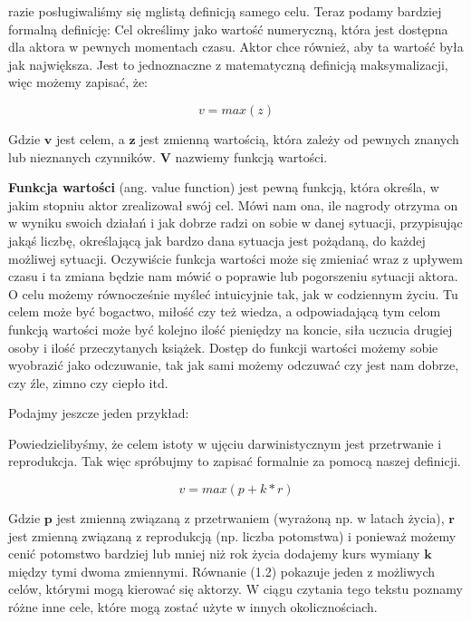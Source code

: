 razie posługiwaliśmy się mglistą definicją samego celu. Teraz podamy bardziej formalną definicję: Cel określimy jako wartość numeryczną, która jest dostępna dla aktora w pewnych momentach czasu. Aktor chce również, aby ta wartość była jak największa. Jest to jednoznaczne z matematyczną definicją maksymalizacji, więc możemy zapisać, że:

\begin{equation}
v = max(z)
\end{equation}

\noindent Gdzie $\boldsymbol{v}$ jest celem, a $\boldsymbol{z}$ jest zmienną wartością, która zależy od pewnych znanych lub nieznanych czynników. $\boldsymbol{V}$ nazwiemy funkcją wartości.\newline

\noindent \textbf{Funkcja wartości} (ang. value function) jest pewną funkcją, która określa, w jakim stopniu aktor zrealizował swój cel. Mówi nam ona, ile nagrody otrzyma on w wyniku swoich działań i jak dobrze radzi on sobie w danej sytuacji, przypisując jakąś liczbę, określającą jak bardzo dana sytuacja jest pożądaną, do każdej możliwej sytuacji. Oczywiście funkcja wartości może się zmieniać wraz z upływem czasu i ta zmiana będzie nam mówić o poprawie lub pogorszeniu sytuacji aktora. O celu możemy równocześnie myśleć intuicyjnie tak, jak w codziennym życiu. Tu celem może być bogactwo, miłość czy też wiedza, a odpowiadającą tym celom funkcją wartości może być kolejno ilość pieniędzy na koncie, siła uczucia drugiej osoby i ilość przeczytanych książek. Dostęp do funkcji wartości możemy sobie wyobrazić jako odczuwanie, tak jak sami możemy odczuwać czy jest nam dobrze, czy źle, zimno czy ciepło itd.\newline

\noindent Podajmy jeszcze jeden przykład:\newline

\noindent Powiedzielibyśmy, że celem istoty w ujęciu darwinistycznym jest przetrwanie i reprodukcja. Tak więc spróbujmy to zapisać formalnie za pomocą naszej definicji.

\begin{equation}
v = max(p + k * r)
\end{equation}

\noindent Gdzie $\boldsymbol{p}$ jest zmienną związaną z przetrwaniem (wyrażoną np. w latach życia), $\boldsymbol{r}$  jest zmienną związaną z reprodukcją (np. liczba potomstwa) i ponieważ możemy cenić potomstwo bardziej lub mniej niż rok życia dodajemy kurs wymiany $\boldsymbol{k}$  między tymi dwoma zmiennymi. Równanie (1.2) pokazuje jeden z możliwych celów, którymi mogą kierować się aktorzy. W ciągu czytania tego tekstu poznamy różne inne cele, które mogą zostać użyte w innych okolicznościach.

